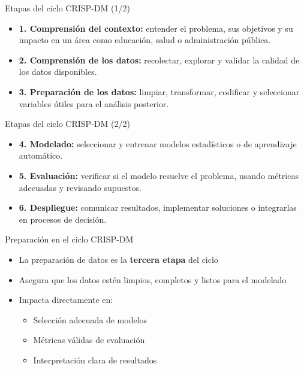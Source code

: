 \documentclass{beamer}
\begin{document}
\begin{frame}{Etapas del ciclo CRISP-DM (1/2)}
\begin{itemize}
    \item \textbf{1. Comprensión del contexto:} entender el problema, sus objetivos y su impacto en un área como educación, salud o administración pública.
    \item \textbf{2. Comprensión de los datos:} recolectar, explorar y validar la calidad de los datos disponibles.
    \item \textbf{3. Preparación de los datos:} limpiar, transformar, codificar y seleccionar variables útiles para el análisis posterior.
\end{itemize}
\end{frame}

\begin{frame}{Etapas del ciclo CRISP-DM (2/2)}
\begin{itemize}
    \item \textbf{4. Modelado:} seleccionar y entrenar modelos estadísticos o de aprendizaje automático.
    \item \textbf{5. Evaluación:} verificar si el modelo resuelve el problema, usando métricas adecuadas y revisando supuestos.
    \item \textbf{6. Despliegue:} comunicar resultados, implementar soluciones o integrarlas en procesos de decisión.
\end{itemize}
\end{frame}


\begin{frame}{Preparación en el ciclo CRISP-DM}
\begin{itemize}
    \item La preparación de datos es la \textbf{tercera etapa} del ciclo
    \item Asegura que los datos estén limpios, completos y listos para el modelado
    \item Impacta directamente en:
    \begin{itemize}
        \item Selección adecuada de modelos
        \item Métricas válidas de evaluación
        \item Interpretación clara de resultados
    \end{itemize}
\end{itemize}
\end{frame}
\end{document}
